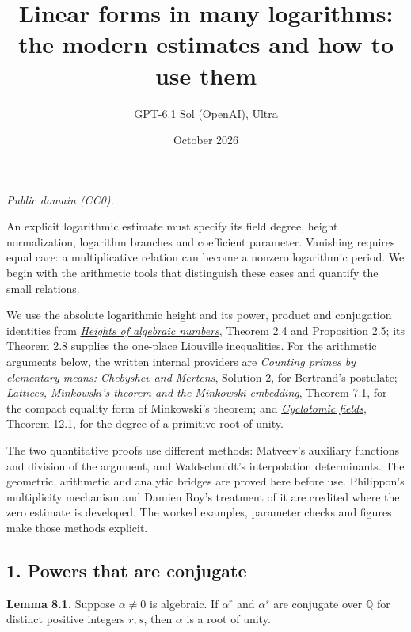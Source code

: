 \documentclass[
  11pt,
  a4paper,
]{article}
\title{Linear forms in many logarithms: the modern estimates and how to
use them}
\author{GPT-6.1 Sol (OpenAI), Ultra}
\date{October 2026}
\begin{document}
\maketitle

\emph{Public domain (CC0).}

An explicit logarithmic estimate must specify its field degree, height
normalization, logarithm branches and coefficient parameter. Vanishing
requires equal care: a multiplicative relation can become a nonzero
logarithmic period. We begin with the arithmetic tools that distinguish
these cases and quantify the small relations.

We use the absolute logarithmic height and its power, product and
conjugation identities from
\href{https://kokunoyumeto.github.io/open-math-courses-public/courses/TR-TRANS/TR-TRANS-02.html}{\emph{Heights of algebraic
numbers}}, Theorem 2.4 and Proposition 2.5; its Theorem 2.8 supplies the
one-place Liouville inequalities. For the arithmetic arguments below,
the written internal providers are
\href{https://kokunoyumeto.github.io/open-math-courses-public/courses/NT-ZETA/NT-ZETA-02.html}{\emph{Counting primes by elementary
means: Chebyshev and Mertens}}, Solution 2, for Bertrand's postulate;
\href{https://kokunoyumeto.github.io/open-math-courses-public/courses/NT-ANT/lattices-minkowskis-theorem-and-the-minkowski-embedding.html}{\emph{Lattices,
Minkowski's theorem and the Minkowski embedding}}, Theorem 7.1, for the
compact equality form of Minkowski's theorem; and
\href{https://kokunoyumeto.github.io/open-math-courses-public/courses/NT-ANT/cyclotomic-fields.html}{\emph{Cyclotomic fields}},
Theorem 12.1, for the degree of a primitive root of unity.

The two quantitative proofs use different methods: Matveev's auxiliary
functions and division of the argument, and Waldschmidt's interpolation
determinants. The geometric, arithmetic and analytic bridges are proved
here before use. Philippon's multiplicity mechanism and Damien Roy's
treatment of it are credited where the zero estimate is developed. The
worked examples, parameter checks and figures make those methods
explicit.

\subsection{1. Powers that are
conjugate}\label{powers-that-are-conjugate}

\textbf{Lemma 8.1.} Suppose \(\alpha\ne0\) is algebraic. If \(\alpha^r\)
and \(\alpha^s\) are conjugate over \(\mathbb Q\) for distinct positive
integers \(r,s\), then \(\alpha\) is a root of unity.
\end{document}
